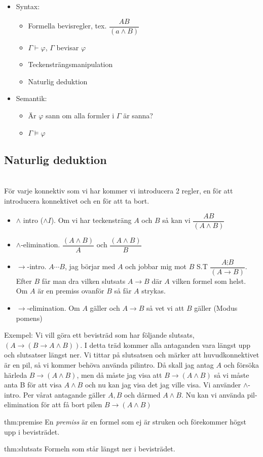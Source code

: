 \begin{itemize}
  \item Syntax:
    \begin{itemize}
      \item Formella bevisregler, tex. $\dfrac{A  B}{(a\wedge B)}$
      \item $\Gamma\vdash\varphi$, $\Gamma$ bevisar $\varphi$
      \item Teckensträngsmanipulation
      \item Naturlig deduktion
    \end{itemize}
  \item Semantik:
    \begin{itemize}
      \item Är $\varphi$ sann om alla formler i $\Gamma$ är sanna?
      \item $\Gamma\vDash\varphi$
    \end{itemize}
\end{itemize}
\par\bigskip

\subsection{Naturlig deduktion}\hfill\\

\noindent För varje konnektiv som vi har kommer vi introducera 2 regler, en för att introducera konnektivet och en för att ta bort.

\begin{itemize}
  \item $\wedge$ intro ($\wedge I$). Om vi har teckensträng $A$ och $B$  så kan vi $\dfrac{AB}{(A\wedge B)}$
  \item $\wedge$-elimination. $\dfrac{(A\wedge B)}{A}$ och $\dfrac{(A\wedge B)}{B}$
  \item $\rightarrow$-intro. $A\cdots B$, jag börjar med $A$ och jobbar mig mot $B$ S.T $\dfrac{A\vdots B}{(A\rightarrow B)}$. Efter $B$ får man dra vilken slutsats $A\rightarrow B$ där $A$ vilken formel som helst. Om $A$ är en premiss ovanför $B$ så får $A$ strykas. 
  \item $\rightarrow$-elimination. Om $A$ gäller och $A\rightarrow B$ så vet vi att $B$ gäller (Modus pomens)
\end{itemize}
\par\bigskip
\noindent Exempel: Vi vill göra ett bevisträd som har följande slutsats, $(A\rightarrow (B\rightarrow A\wedge B))$. I detta träd kommer alla antaganden vara längst upp och slutsatser längst ner. Vi tittar på slutsatsen och märker att huvudkonnektivet är en pil, så vi kommer behöva använda pilintro. Då skall jag antag $A$ och försöka härleda $B\rightarrow(A\wedge B)$, men då måste jag visa att $B\rightarrow(A\wedge B)$ så vi måste anta B för att visa $A\wedge B$ och nu kan jag visa det jag ville visa. Vi använder $\wedge$-intro. Per vårat antagande gäller $A, B$ och därmed $A\wedge B$. Nu kan vi använda pil-elimination för att få bort pilen $B\rightarrow(A\wedge B)$
\par\bigskip


\begin{theo}[Premiss]{thm:premise}
  En \textit{premiss} är en formel som ej är struken och förekommer högst upp i bevisträdet.
\end{theo}
\par\bigskip

\begin{theo}[Slutsats]{thm:slutsats}
  Formeln som står längst ner i bevisträdet.
\end{theo}
